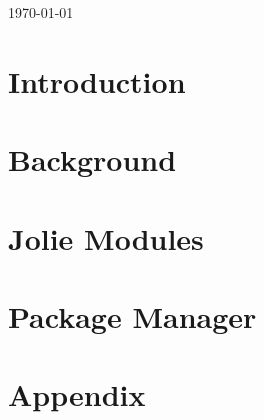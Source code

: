 \documentclass[11pt, a4paper]{report} %
\newcommand{\blankpage}{
  \newpage
  \thispagestyle{empty}
  \mbox{}
  \newpage
}
\begin{document}
\begin{titlepage}
\vfill


{\large \today}%

\end{titlepage}

\tableofcontents

\blankpage

\pagestyle{MyStyle}

\chapter{Introduction}


\chapter{Background}


\chapter{Jolie Modules}


\chapter{Package Manager}


\appendix
\chapter{Appendix}

\end{document}
